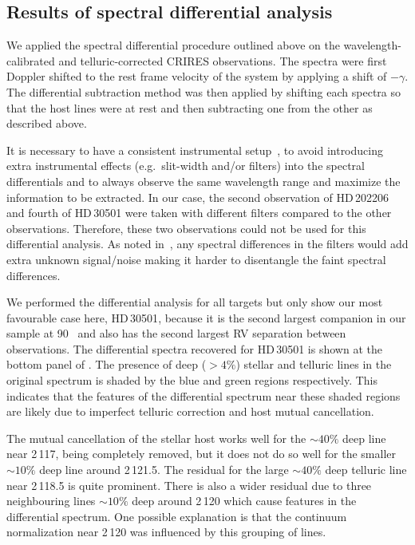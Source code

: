 \subsection{Results of spectral differential analysis}
\label{subsec:differential_results}

We applied the spectral differential procedure outlined above on the wavelength-calibrated and telluric-corrected {CRIRES} observations. The spectra were first Doppler shifted to the rest frame velocity of the system by applying a shift of \(-\gamma\). The differential subtraction method was then applied by shifting each spectra so that the host lines were at rest and then subtracting one from the other as described above.

It is necessary to have a consistent instrumental setup~\citet{ferluga_separating_1997}, to avoid introducing extra instrumental effects (e.g.\ slit-width and/or filters) into the spectral differentials and to always observe the same wavelength range and maximize the information to be extracted. In our case, the second observation of {HD\,202206} and fourth of {HD\,30501} were taken with different filters compared to the other observations. Therefore, these two observations could not be used for this differential analysis. As noted in~\citep{hadrava_disentangling_2009}, any spectral differences in the filters would add extra unknown signal/noise making it harder to disentangle the faint spectral differences.

We performed the differential analysis for all targets but only show our most favourable case here, {HD\,30501}, because it is the second largest companion in our sample at 90~\Mjup{} and also has the second largest {RV} separation between observations. The differential spectra recovered for {HD\,30501} is shown at the bottom panel of . The presence of deep (\(>4\%\)) stellar and telluric lines in the original spectrum is shaded by the blue and green regions respectively. This indicates that the features of the differential spectrum near these shaded regions are likely due to imperfect telluric correction and host mutual cancellation.

The mutual cancellation of the stellar host works well for the \(\sim40\%\) deep line near 2\,117\nm{}, being completely removed, but it does not do so well for the smaller \(\sim10\%\) deep line around 2\,121.5\nm{}. The residual for the large \(\sim40\%\) deep telluric line near 2\,118.5\nm{} is quite prominent. There is also a wider residual due to three neighbouring lines \(\sim10\%\) deep around 2\,120\nm{} which cause features in the differential spectrum. One possible explanation is that the continuum normalization near 2\,120\nm{} was influenced by this grouping of lines.

